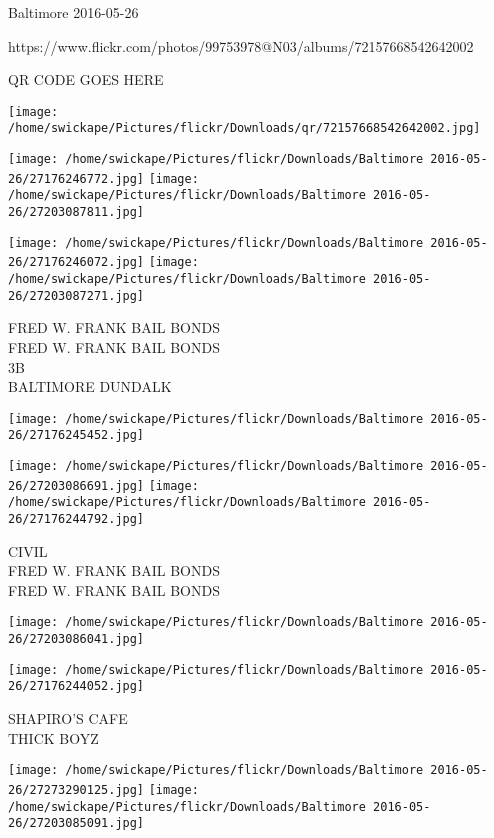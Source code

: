 \documentclass[10pt,letterpaper]{article}
\begin{document}
Baltimore 2016-05-26

https://www.flickr.com/photos/99753978@N03/albums/72157668542642002

QR CODE GOES HERE

\texttt{[image: /home/swickape/Pictures/flickr/Downloads/qr/72157668542642002.jpg]}
\pagebreak

\texttt{[image: /home/swickape/Pictures/flickr/Downloads/Baltimore 2016-05-26/27176246772.jpg]}
\texttt{[image: /home/swickape/Pictures/flickr/Downloads/Baltimore 2016-05-26/27203087811.jpg]}

\texttt{[image: /home/swickape/Pictures/flickr/Downloads/Baltimore 2016-05-26/27176246072.jpg]}
\texttt{[image: /home/swickape/Pictures/flickr/Downloads/Baltimore 2016-05-26/27203087271.jpg]}

FRED W. FRANK BAIL BONDS\\
FRED W. FRANK BAIL BONDS\\
3B\\
BALTIMORE DUNDALK\\
\pagebreak

\texttt{[image: /home/swickape/Pictures/flickr/Downloads/Baltimore 2016-05-26/27176245452.jpg]}

\vspace{0.25in}
\texttt{[image: /home/swickape/Pictures/flickr/Downloads/Baltimore 2016-05-26/27203086691.jpg]}
\texttt{[image: /home/swickape/Pictures/flickr/Downloads/Baltimore 2016-05-26/27176244792.jpg]}

CIVIL\\
FRED W. FRANK BAIL BONDS\\
FRED W. FRANK BAIL BONDS\\
\pagebreak

\texttt{[image: /home/swickape/Pictures/flickr/Downloads/Baltimore 2016-05-26/27203086041.jpg]}

\vspace{0.25in}
\texttt{[image: /home/swickape/Pictures/flickr/Downloads/Baltimore 2016-05-26/27176244052.jpg]}

SHAPIRO'S CAFE\\
THICK BOYZ\\
\pagebreak

\texttt{[image: /home/swickape/Pictures/flickr/Downloads/Baltimore 2016-05-26/27273290125.jpg]}
\texttt{[image: /home/swickape/Pictures/flickr/Downloads/Baltimore 2016-05-26/27203085091.jpg]}
\end{document}
